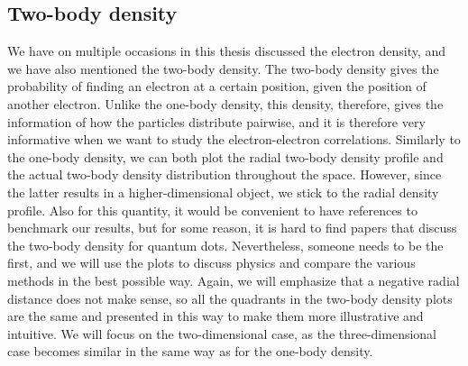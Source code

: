 \subsection{Two-body density}
We have on multiple occasions in this thesis discussed the electron density, and we have also mentioned the two-body density. The two-body density gives the probability of finding an electron at a certain position, given the position of another electron. Unlike the one-body density, this density, therefore, gives the information of how the particles distribute pairwise, and it is therefore very informative when we want to study the electron-electron correlations. Similarly to the one-body density, we can both plot the radial two-body density profile and the actual two-body density distribution throughout the space. However, since the latter results in a higher-dimensional object, we stick to the radial density profile. Also for this quantity, it would be convenient to have references to benchmark our results, but for some reason, it is hard to find papers that discuss the two-body density for quantum dots. Nevertheless, someone needs to be the first, and we will use the plots to discuss physics and compare the various methods in the best possible way. Again, we will emphasize that a negative radial distance does not make sense, so all the quadrants in the two-body density plots are the same and presented in this way to make them more illustrative and intuitive. We will focus on the two-dimensional case, as the three-dimensional case becomes similar in the same way as for the one-body density. 

